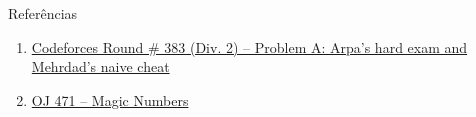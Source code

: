 \begin{frame}[fragile]{Referências}

    \begin{enumerate}
        \item \href{https://codeforces.com/problemset/problem/742/A}{Codeforces Round \# 383 (Div. 2) -- Problem A: Arpa's hard exam and Mehrdad's naive cheat}
 
        \item \href{https://onlinejudge.org/index.php?option=com_onlinejudge&Itemid=8&category=24&page=show_problem&problem=412}{OJ 471 -- Magic Numbers} 

    \end{enumerate}

\end{frame}
